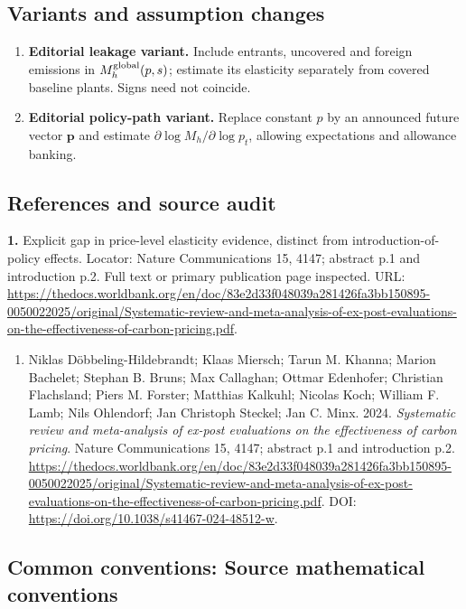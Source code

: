 \documentclass[11pt,a4paper]{article}
\begin{document}
\subsection*{Variants and assumption changes}
\begin{enumerate}
\item \textbf{Editorial leakage variant.} Include entrants, uncovered and foreign emissions in \(M_h^{\rm global}(p,s)\); estimate its elasticity separately from covered baseline plants. Signs need not coincide.
\item \textbf{Editorial policy-path variant.} Replace constant \(p\) by an announced future vector \(\mathbf p\) and estimate \(\partial\log M_h/\partial\log p_t\), allowing expectations and allowance banking.
\end{enumerate}
\subsection*{References and source audit}
\textbf{1.} Explicit gap in price-level elasticity evidence, distinct from introduction-of-policy effects. Locator: Nature Communications 15, 4147; abstract p.1 and introduction p.2. Full text or primary publication page inspected. URL: \url{https://thedocs.worldbank.org/en/doc/83e2d33f048039a281426fa3bb150895-0050022025/original/Systematic-review-and-meta-analysis-of-ex-post-evaluations-on-the-effectiveness-of-carbon-pricing.pdf}.
\begin{enumerate}\raggedright
\item\hypertarget{definitions:source:30007717:1}{} Niklas Döbbeling-Hildebrandt; Klaas Miersch; Tarun M. Khanna; Marion Bachelet; Stephan B. Bruns; Max Callaghan; Ottmar Edenhofer; Christian Flachsland; Piers M. Forster; Matthias Kalkuhl; Nicolas Koch; William F. Lamb; Nils Ohlendorf; Jan Christoph Steckel; Jan C. Minx. 2024. \emph{Systematic review and meta-analysis of ex-post evaluations on the effectiveness of carbon pricing}. Nature Communications 15, 4147; abstract p.1 and introduction p.2.
\url{https://thedocs.worldbank.org/en/doc/83e2d33f048039a281426fa3bb150895-0050022025/original/Systematic-review-and-meta-analysis-of-ex-post-evaluations-on-the-effectiveness-of-carbon-pricing.pdf}.
DOI: \url{https://doi.org/10.1038/s41467-024-48512-w}.
\end{enumerate}

\subsection*{Common conventions: Source mathematical conventions}
\end{document}
